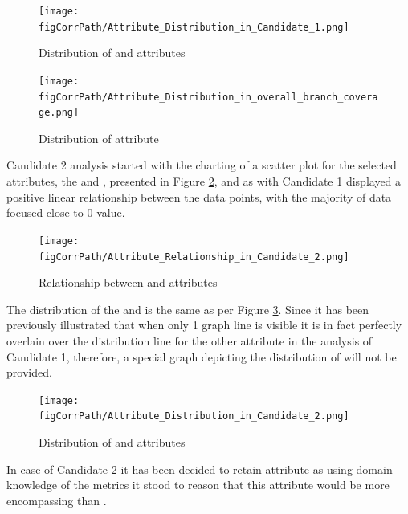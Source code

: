 \begin{enumerate}
\begin{landscape}
\begin{figure}
\centering
\begin{minipage}{0.89\textwidth}
  \centering
  \texttt{[image: \\figCorrPath/Attribute\_Distribution\_in\_Candidate\_1.png]}
    \caption{Distribution of \overallBranchCoverage{} and \branchCoverage{} attributes}
    \label{fig:candidate1-distribution}
\end{minipage}%
\begin{minipage}{0.89\textwidth}
   \texttt{[image: \\figCorrPath/Attribute\_Distribution\_in\_overall\_branch\_coverage.png]}
    \caption{Distribution of \overallBranchCoverage{} attribute}
    \label{fig:candidate1-attrib2-distribution}
\end{minipage}
\end{figure}
\end{landscape}
\FloatBarrier

Candidate 2 analysis started with the charting of a scatter plot for the selected attributes, the \overallUncoveredLines{} and \uncoveredLines{}, presented in Figure \ref{fig:candidate2-scatterplot}, and as with Candidate 1 displayed a positive linear relationship between the data points, with the majority of data focused close to 0 value.

\begin{figure}[h!]
    \centering
    \texttt{[image: \\figCorrPath/Attribute\_Relationship\_in\_Candidate\_2.png]}
    \caption{Relationship between \overallUncoveredLines{} and \uncoveredLines{} attributes}
    \label{fig:candidate2-scatterplot}
\end{figure}

The distribution of the \overallUncoveredLines{} and \uncoveredLines{} is the same as per Figure \ref{fig:candidate2-distribution}. Since it has been previously illustrated that when only 1 graph line is visible it is in fact perfectly overlain over the distribution line for the other attribute in the analysis of Candidate 1, therefore, a special graph depicting the distribution of \uncoveredLines{} will not be provided.
\begin{figure}
    \centering
  \texttt{[image: \\figCorrPath/Attribute\_Distribution\_in\_Candidate\_2.png]}
    \caption{Distribution of \overallUncoveredLines{} and \uncoveredLines{} attributes}
    \label{fig:candidate2-distribution}
\end{figure}
In case of Candidate 2 it  has been decided to retain \overallUncoveredLines{} attribute as using domain knowledge of the metrics it stood to reason that this attribute would be more encompassing than \uncoveredLines{}.
\FloatBarrier


\end{enumerate}
